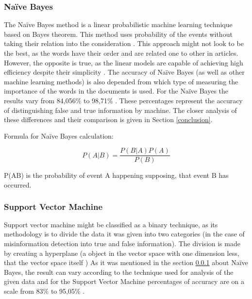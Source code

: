 \documentclass[11pt ,english,a4paper]{article}
\begin{document}
\subsubsection{Naïve Bayes}\label{nb}
The Naïve Bayes method is a linear probabilistic machine learning technique based on Bayes theorem. This method uses probability of the events without taking their relation into the consideration \cite{sha20mach}. This approach might not look to be the best, as the words have their order and are related one to other in articles. However, the opposite is true, as the linear models are capable of achieving high efficiency despite their simplicity \cite{pod19mach}. The accuracy of Naïve Bayes (as well as other machine learning methods) is also depended from which type of measuring the importance of the words in the documents is used. For the Naïve Bayes the results vary from 84,056\% \cite{sha20mach} to 98,71\% \cite{bar21health}. These percentages represent the accuracy of distinguishing false and true information by machine. The closer analysis of these differences and their comparison is given in Section \ref{conclusion}.

Formula for Naïve Bayes calculation: \cite{sha20mach}

\begin{equation}
P(A|B) = \frac{P(B|A)P(A)}{P(B)}
\end{equation}

P(A\textbar B) is the probability of event A happening supposing, that event B has occurred.

\subsubsection{Support Vector Machine}\label{svm}
Support vector machine might be classified as a binary technique, as its methodology is to divide the data it was given into two categories \cite{pod19mach} (in the case of misinformation detection into true and false information). The division is made by creating a hyperplane (a object in the vector space with one dimension less, that the vector space itself \cite{sha20mach})
As it was mentioned in the section \ref{nb} about Naïve Bayes, the result can vary according to the technique used for analysis of the given data and for the Support Vector Machine percentages of accuracy are on a scale from 83\% \cite{chap22unmask} to 95,05\% \cite{sha20mach}.

\end{document}
